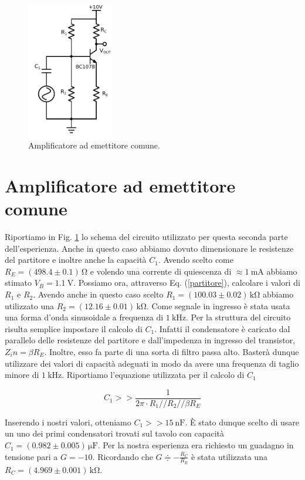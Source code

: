 \begin{figure}
	\includegraphics[width=38mm]{cc2.pdf}
	\caption{Amplificatore ad emettitore comune.}
	\label{fig:cc2}
\end{figure}

\section{Amplificatore ad emettitore comune}

Riportiamo in Fig. \ref{fig:cc2} lo schema del circuito utilizzato per questa seconda parte dell'esperienza.
Anche in questo caso abbiamo dovuto dimensionare le resistenze del partitore e inoltre anche la capacità $C_1$.
Avendo scelto come $R_E=(498.4\pm0.1)\,\si{\ohm}$ e volendo una corrente di quiescenza di $\approx \SI{1}{\milli\ampere}$ abbiamo stimato $V_B=\SI{1.1}{\volt}$.
Possiamo ora, attraverso Eq. (\ref{partitore}), calcolare i valori di $R_1$ e $R_2$.
Avendo anche in questo caso scelto $R_1=(100.03\pm0.02)\,\si{\kilo\ohm}$ abbiamo utilizzato una $R_2=(12.16\pm0.01)\,\si{\kilo\ohm}$.
Come segnale in ingresso è stata usata una forma d'onda sinusoidale a frequenza di $\SI{1}{\kilo\hertz}$.
Per la struttura del circuito risulta semplice impostare il calcolo di $C_1$.
Infatti il condensatore è caricato dal parallelo delle resistenze del partitore e dall'impedenza in ingresso del transistor, $Z_in=\beta R_E$.
Inoltre, esso fa parte di una sorta di filtro passa alto.
Basterà dunque utilizzare dei valori di capacità adeguati in modo da avere una frequenza di taglio minore di $\SI{1}{\kilo\hertz}$.
Riportiamo l'equazione utilizzata per il calcolo di $C_1$

\begin{equation}
C_1>>\frac{1}{2 \pi \cdot R_1 // R_2//\beta R_E}
\end{equation}

Inserendo i nostri valori, otteniamo $C_1>>\SI{15}{\nano\farad}$.
È stato dunque scelto di usare un uno dei primi condensatori trovati sul tavolo con capacità $C_1=(0.982\pm0.005)\,\si{\micro\farad}$.
Per la nostra esperienza era richiesto un guadagno in tensione pari a $G=-10$.
Ricordando che $G\doteqdot - \frac{R_C}{R_E}$ è stata utilizzata una $R_C=(4.969\pm0.001)\,\si{\kilo\ohm}$. 

